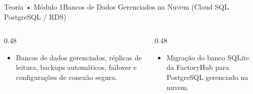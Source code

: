 \begin{senaiframe}{Teoria • Módulo 1}{Bancos de Dados Gerenciados na Nuvem (Cloud SQL PostgreSQL / RDS)}
  \begin{columns}[t]
    \begin{column}{0.48\textwidth}
      \begin{tcolorbox}[senaibluecard, title={Fundamentos Teóricos}]
        \begin{itemize}
          \item Bancos de dados gerenciados, réplicas de leitura, backups automáticos, failover e configurações de conexão segura.
        \end{itemize}
      \end{tcolorbox}
    \end{column}
    \begin{column}{0.48\textwidth}
      \begin{tcolorbox}[senaigreencard, title={Prática \& Laboratório}]
        \begin{itemize}
          \item Migração do banco SQLite da FactoryHub para PostgreSQL gerenciado na nuvem.
        \end{itemize}
      \end{tcolorbox}
    \end{column}
  \end{columns}
\end{senaiframe}
